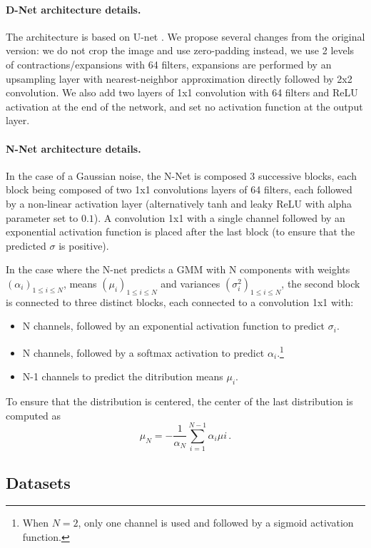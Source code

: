 \documentclass{article}
\begin{document}
\paragraph{D-Net architecture details.}
The architecture is based on U-net \cite{ronneberger2015u}.
We propose several changes from the original version: we do not crop the image and use zero-padding instead, we use 2 levels of contractions/expansions with 64 filters, expansions are performed by an upsampling layer with nearest-neighbor approximation directly followed by 2x2 convolution. We also add two layers of 1x1 convolution with 64 filters and ReLU activation at the end of the network, and set no activation function at the output layer.

\paragraph{N-Net architecture details.}
In the case of a Gaussian noise, the N-Net is composed 3 successive blocks, each block being composed of two 1x1 convolutions layers of 64 filters, each followed by a non-linear activation layer (alternatively tanh and leaky ReLU with alpha parameter set to $0.1$). A convolution 1x1 with a single channel followed by an exponential activation function is placed after the last block (to ensure that the predicted $\sigma$ is positive).

In the case where the N-net predicts a GMM with N components with weights $(\alpha_i)_{1\leqslant i\leqslant N}$, means $(\mu_i)_{1\leqslant i\leqslant N}$ and variances $(\sigma^2_i)_{1\leqslant i\leqslant N}$, the second block is connected to three distinct blocks, each connected to a convolution 1x1 with:
\begin{itemize}
  \item N channels, followed by an exponential activation function to predict $\sigma_{i}$.
  \item N channels, followed by a softmax activation to predict $\alpha_{i}.$\footnote{When $N=2$, only one channel is used and followed by a sigmoid activation function.}
  \item N-1 channels to predict the ditribution means $\mu_{i}$.
\end{itemize}
To ensure that the distribution is centered, the center of the last distribution is computed as
$$
\mu_{N} = - \frac{1}{\alpha_{N}} \sum_{i=1}^{N-1}{\alpha_{i} \mu{i}}\,.
$$

\subsection{Datasets}
\end{document}
